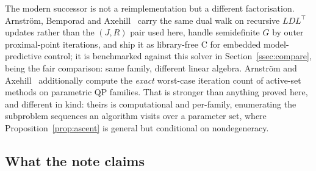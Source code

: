 The modern successor is not a reimplementation but a different factorisation.
Arnstr\"om, Bemporad and Axehill~\cite{arnstrom2022daqp} carry the same dual walk on
recursive $LDL^\top$ updates rather than the $(J,R)$ pair used here, handle
semidefinite $G$ by outer proximal-point iterations, and ship it as library-free C
for embedded model-predictive control; it is benchmarked against this solver in
Section~\ref{ssec:compare}, being the fair comparison: same family, different
linear algebra. Arnstr\"om and Axehill~\cite{arnstrom2022certification}
additionally compute the \emph{exact} worst-case iteration count of active-set
methods on parametric QP families. That is stronger than anything proved here, and
different in kind: theirs is computational and per-family, enumerating the
subproblem sequences an algorithm visits over a parameter set, where
Proposition~\ref{prop:ascent} is general but conditional on nondegeneracy.

\subsection{What the note claims}

